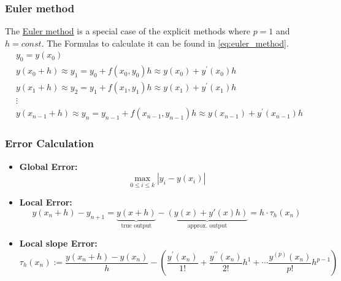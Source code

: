 \subsubsection{Euler method}
The \href{https://en.wikipedia.org/wiki/Euler_method}{Euler method} is a special case of the explicit methods where $p=1$ and $h=const$. The Formulas to calculate it can be found in \autoref{eq:euler_method}.
\begin{equation}\label{eq:euler_method}
\begin{gathered}
y_0=y\left(x_0\right) \\
y\left(x_0+h\right) \approx y_1=y_0+f\left(x_0, y_0\right) h \approx y\left(x_0\right)+y^{\prime}\left(x_0\right) h \\
y\left(x_1+h\right) \approx y_2=y_1+f\left(x_1, y_1\right) h \approx y\left(x_1\right)+y^{\prime}\left(x_1\right) h \\
\vdots \\
y\left(x_{n-1}+h\right) \approx y_n=y_{n-1}+f\left(x_{n-1}, y_{n-1}\right) h \approx y\left(x_{n-1}\right)+y^{\prime}\left(x_{n-1}\right) h
\end{gathered}
\end{equation}
\subsubsection{Error Calculation}
\begin{itemize}
    \item \textbf{Global Error:} 
    \begin{equation}\label{eq:global_error_explicit_method}
    \max _{0 \leq i \leq k}\left|y_i-y\left(x_i\right)\right|
    \end{equation}
    \item \textbf{Local Error:}
    \begin{equation}\label{eq:local_error_explicit_method}
    y\left(x_n+h\right)-y_{n+1}= \underbrace{y(x+h)}_{\text{true output}}- \underbrace{(y(x)+y'(x)h)}_{\text{approx. output}}=h \cdot \tau_h\left(x_n\right)
    \end{equation}
     \item \textbf{Local slope Error:}
    \begin{equation}\label{eq:local_slope_error_explicit_method}
    \tau_h\left(x_n\right):=\frac{y\left(x_n+h\right)-y\left(x_n\right)}{h}-\left(\frac{y^{\prime}\left(x_n\right)}{1 !}+\frac{y^{\prime \prime}\left(x_n\right)}{2 !} h^1+\cdots \frac{y^{(p)}\left(x_n\right)}{p !} h^{p-1}\right)
    \end{equation}
\end{itemize}
